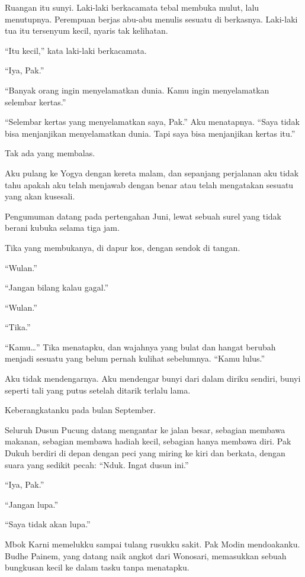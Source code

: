\documentclass[11pt,twoside,openany]{book}
\makeatletter
\newcommand{\scenebreak}{\par\vspace{0.9em}{\centering\textsc{*\hspace{0.7em}*\hspace{0.7em}*}\par}\vspace{0.9em}\@afterindentfalse\@afterheading}
\makeatother
\begin{document}
Ruangan itu sunyi. Laki-laki berkacamata tebal membuka mulut, lalu menutupnya. Perempuan berjas abu-abu menulis sesuatu di berkasnya. Laki-laki tua itu tersenyum kecil, nyaris tak kelihatan.

``Itu kecil,'' kata laki-laki berkacamata.

``Iya, Pak.''

``Banyak orang ingin menyelamatkan dunia. Kamu ingin menyelamatkan selembar kertas.''

``Selembar kertas yang menyelamatkan saya, Pak.'' Aku menatapnya. ``Saya tidak bisa menjanjikan menyelamatkan dunia. Tapi saya bisa menjanjikan kertas itu.''

Tak ada yang membalas.

Aku pulang ke Yogya dengan kereta malam, dan sepanjang perjalanan aku tidak tahu apakah aku telah menjawab dengan benar atau telah mengatakan sesuatu yang akan kusesali.

\scenebreak
Pengumuman datang pada pertengahan Juni, lewat sebuah surel yang tidak berani kubuka selama tiga jam.

Tika yang membukanya, di dapur kos, dengan sendok di tangan.

``Wulan.''

``Jangan bilang kalau gagal.''

``Wulan.''

``Tika.''

``Kamu\ldots{}'' Tika menatapku, dan wajahnya yang bulat dan hangat berubah menjadi sesuatu yang belum pernah kulihat sebelumnya. ``Kamu lulus.''

Aku tidak mendengarnya. Aku mendengar bunyi dari dalam diriku sendiri, bunyi seperti tali yang putus setelah ditarik terlalu lama.

\scenebreak
Keberangkatanku pada bulan September.

Seluruh Dusun Pucung datang mengantar ke jalan besar, sebagian membawa makanan, sebagian membawa hadiah kecil, sebagian hanya membawa diri. Pak Dukuh berdiri di depan dengan peci yang miring ke kiri dan berkata, dengan suara yang sedikit pecah: ``Nduk. Ingat dusun ini.''

``Iya, Pak.''

``Jangan lupa.''

``Saya tidak akan lupa.''

Mbok Karni memelukku sampai tulang rusukku sakit. Pak Modin mendoakanku. Budhe Painem, yang datang naik angkot dari Wonosari, memasukkan sebuah bungkusan kecil ke dalam tasku tanpa menatapku.
\end{document}
